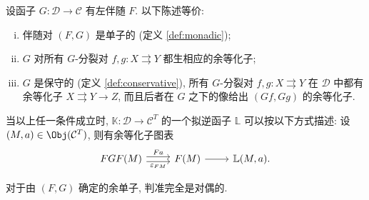 \begin{theorem}[J.\ M.\ Beck]\label{prop:Beck}
	设函子 $G: \mathcal{D} \to \mathcal{C}$ 有左伴随 $F$. 以下陈述等价:
	\begin{enumerate}[(i)]
		\item 伴随对 $(F, G)$ 是单子的 (定义 \ref{def:monadic});
		\item $G$ 对所有 $G$-分裂对 $f, g: X \rightrightarrows Y$ 都生相应的余等化子;
		\item $G$ 是保守的 (定义 \ref{def:conservative}), 所有 $G$-分裂对 $f, g: X \rightrightarrows Y$ 在 $\mathcal{D}$ 中都有余等化子 $X \rightrightarrows Y \to Z$, 而且后者在 $G$ 之下的像给出 $(Gf, Gg)$ 的余等化子.
	\end{enumerate}

	当以上任一条件成立时, $\mathbb{K}: \mathcal{D} \to \mathcal{C}^T$ 的一个拟逆函子 $\mathbb{L}$ 可以按以下方式描述: 设 $(M, a) \in \Obj(\mathcal{C}^T)$, 则有余等化子图表
	\begin{equation}\label{eqn:Beck-aux1}\begin{tikzcd}
		FGF(M) \arrow[shift left, r, "Fa"] \arrow[shift right, r, "\varepsilon_{FM}"'] & F(M) \arrow[r] & \mathbb{L}(M, a).
	\end{tikzcd}\end{equation}

	对于由 $(F, G)$ 确定的余单子, 判准完全是对偶的.
\end{theorem}
